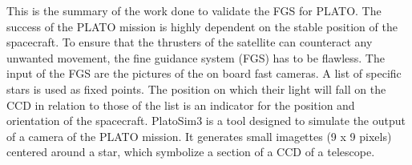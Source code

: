 This is the summary of the work done to validate the FGS for PLATO.
\newline
The success of the PLATO mission is highly dependent on the stable position of the spacecraft. To ensure that the thrusters of the satellite can counteract any unwanted movement, the fine guidance system (FGS) has to be flawless. The input of the FGS are the pictures of the on board fast cameras. A list of specific stars is used as fixed points. The position on which their light will fall on the CCD in relation to those of the list is an indicator for the position and orientation of the spacecraft. 
\newline
PlatoSim3 is a tool designed to simulate the output of a camera of the PLATO mission. It generates small imagettes (9 x 9 pixels) centered around a star, which symbolize a section of a CCD of a telescope. 